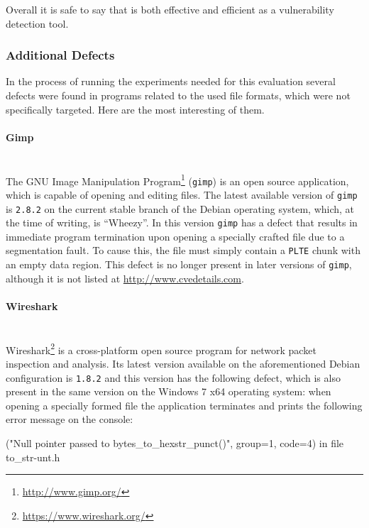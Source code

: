 Overall it is safe to say that \xmlmate is both effective and efficient as a vulnerability detection tool.


\subsubsection{Additional Defects}
In the process of running the experiments needed for this evaluation several defects were found in programs
related to the used file formats, which were not specifically targeted. Here are the most interesting of them.
\paragraph{Gimp} ~\\
The GNU Image Manipulation Program\footnote{\url{http://www.gimp.org/}} (\texttt{gimp}) is an open source
application, which is capable of opening and editing \png files. The latest available version of \texttt{gimp}
is \texttt{2.8.2} on the current stable branch of the Debian operating system, which, at the time of writing,
is ``Wheezy''. In this version \texttt{gimp} has a defect that results in immediate program termination upon
opening a specially crafted \png file due to a segmentation fault. To cause this, the \png file must
simply contain a \texttt{PLTE} chunk with an empty data region. This defect is no longer present in later
versions of \texttt{gimp}, although it is not listed at \url{http://www.cvedetails.com}.
\paragraph{Wireshark} ~\\
Wireshark\footnote{\url{https://www.wireshark.org/}} is a cross-platform open source program for network packet
inspection and analysis. Its latest version available on the aforementioned Debian configuration is
\texttt{1.8.2} and this version has the following defect, which is also present in the same version on the
Windows 7 x64 operating system: when opening a specially formed \pcap file the application terminates and
prints the following error message on the console:

{\small ("Null pointer passed to bytes\_to\_hexstr\_punct()", group=1, code=4) in file to\_str-unt.h}

